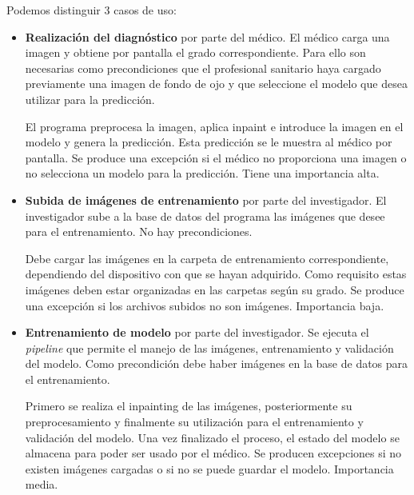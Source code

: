 Podemos distinguir 3 casos de uso:
\begin{itemize}
    \item \textbf{Realización del diagnóstico} por parte del médico. El médico carga una imagen y obtiene por pantalla el grado correspondiente. Para ello son necesarias como precondiciones que el profesional sanitario haya cargado previamente una imagen de fondo de ojo y que seleccione el modelo que desea utilizar para la predicción.
    
    El programa preprocesa la imagen, aplica inpaint e introduce la imagen en el modelo y genera la predicción. Esta predicción se le muestra al médico por pantalla. Se produce una excepción si el médico no proporciona una imagen o no selecciona un modelo para la predicción. Tiene una importancia alta.
    \item \textbf{Subida de imágenes de entrenamiento} por parte del investigador. El investigador sube a la base de datos del programa las imágenes que desee para el entrenamiento. No hay precondiciones.
    
    Debe cargar las imágenes en la carpeta de entrenamiento correspondiente, dependiendo del dispositivo con que se hayan adquirido. Como requisito estas imágenes deben estar organizadas en las carpetas según su grado. Se produce una excepción si los archivos subidos no son imágenes. Importancia baja.
    \item \textbf{Entrenamiento de modelo} por parte del investigador. Se ejecuta el \textit{pipeline} que permite el manejo de las imágenes, entrenamiento y validación del modelo. Como precondición debe haber imágenes en la base de datos para el entrenamiento.
    
    Primero se realiza el inpainting de las imágenes, posteriormente su preprocesamiento y finalmente su utilización para el entrenamiento y validación del modelo. Una vez finalizado el proceso, el estado del modelo se almacena para poder ser usado por el médico. Se producen excepciones si no existen imágenes cargadas o si no se puede guardar el modelo. Importancia media.
\end{itemize}



